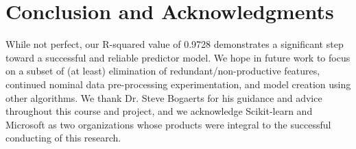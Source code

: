 \documentclass[letterpaper]{article}
\begin{document}
\section{Conclusion and Acknowledgments}

While not perfect, our R-squared value of 0.9728 demonstrates a significant step toward a successful and reliable predictor model.  We hope in future work to focus on a subset of (at least) elimination of redundant/non-productive features, continued nominal data pre-processing experimentation, and model creation using other algorithms.  We thank Dr. Steve Bogaerts for his guidance and advice throughout this course and project, and we acknowledge Scikit-learn and Microsoft as two organizations whose products were integral to the successful conducting of this research.
\end{document}
